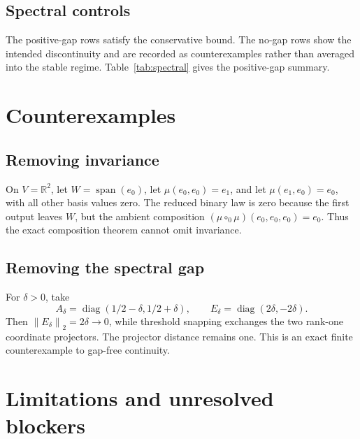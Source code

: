 \documentclass[11pt]{amsart}
\theoremstyle{definition}
\newcommand{\norm}[1]{\left\lVert #1\right\rVert}
\newcommand{\R}{\mathbb{R}}
\begin{document}
\subsection{Spectral controls}

The positive-gap rows satisfy the conservative bound. The no-gap rows show the intended discontinuity and are recorded as counterexamples rather than averaged into the stable regime. Table~\ref{tab:spectral} gives the positive-gap summary.

\begin{table}[t]
\centering
\caption{Positive-gap snapping summary over five seeds per cell.}
\label{tab:spectral}

\end{table}

\section{Counterexamples}
\label{sec:counterexamples}

\subsection{Removing invariance}

On \(V=\R^2\), let \(W=\operatorname{span}(e_0)\), let \(\mu(e_0,e_0)=e_1\), and let \(\mu(e_1,e_0)=e_0\), with all other basis values zero. The reduced binary law is zero because the first output leaves \(W\), but the ambient composition \((\mu\circ_0\mu)(e_0,e_0,e_0)=e_0\). Thus the exact composition theorem cannot omit invariance.

\subsection{Removing the spectral gap}

For \(\delta>0\), take
\[
A_\delta=\operatorname{diag}(1/2-\delta,1/2+\delta),\qquad
E_\delta=\operatorname{diag}(2\delta,-2\delta).
\]
Then \(\norm{E_\delta}_2=2\delta\to0\), while threshold snapping exchanges the two rank-one coordinate projectors. The projector distance remains one. This is an exact finite counterexample to gap-free continuity.

\section{Limitations and unresolved blockers}
\end{document}
